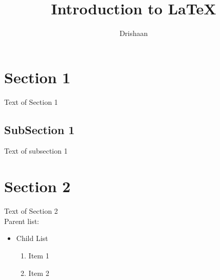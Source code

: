 \documentclass{article}
\begin{document}
	\title{Introduction to \LaTeX{}}
	\author{Drishaan}

	\maketitle

	\tableofcontents

	\section{Section 1}
	{\selectfont \Large Text of Section 1}
	\subsection{SubSection 1}
	Text of subsection 1
	\section{Section 2}
	{\selectfont \Huge Text of Section 2}
	\\Parent list:
	\begin{itemize}
		\item Child List
		\begin{enumerate}
			\item Item 1
			\item Item 2
		\end{enumerate}
	\end{itemize}
\end{document}
